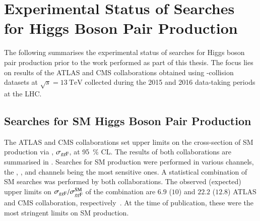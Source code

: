 \section{Experimental Status of Searches for Higgs Boson Pair Production}%
\label{seq:experimental_status}

The following summarises the experimental status of searches for Higgs boson
pair production prior to the work performed as part of this thesis. The focus
lies on results of the ATLAS and CMS collaborations obtained using \pp-collision
datasets at $\sqrt{s} = \SI{13}{\TeV}$ collected during the 2015 and 2016
data-taking periods at the LHC.



\subsection{Searches for SM Higgs Boson Pair Production}%
\label{sec:past_results_smhh}


The ATLAS and CMS collaborations set upper limits on the cross-section of SM \HH
production via \ggF, $\sigma_{gg\text{F}}$, at \SI{95}{\percent} CL. The results of
both collaborations are summarised in . Searches for
SM \HH production were performed in various channels, the \bbbb, \bbtautau, and
\bbyy channels being the most sensitive ones. A statistical combination of SM
\HH searches was performed by both collaborations. The observed (expected) upper
limits on $\sigma_{gg\text{F}} / \sigma_{gg\text{F}}^{\text{SM}}$ of the combination are
$6.9$ ($10$) and $22.2$ ($12.8$) ATLAS and CMS collaboration,
respectively~\cite{HDBS-2018-58,CMS-HIG-17-030}. At the time of publication,
these were the most stringent limits on SM \HH production.

